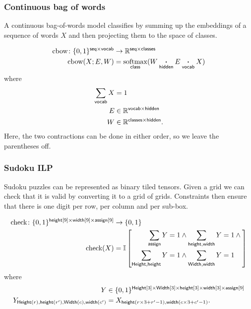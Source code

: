 \documentclass{article}
\newcommand{\reals}{\mathbb{R}}
\begin{document}
\subsubsection{Continuous bag of words}

A continuous bag-of-words model classifies by summing up the embeddings of a sequence of words $X$ and then projecting them to the space of classes. 

\begin{align*}
\text{cbow} \colon \{0, 1\}^{\name{seq} \times \name{vocab}} &\rightarrow \reals^{\name{seq} \times \name{classes}} \\
\text{cbow}(X; E, W) &= \nfun{class}{softmax} (W \ndot{hidden} E \ndot{vocab} X)
\end{align*}
where
\begin{align*}
\nsum{vocab} X &= 1 \\
E &\in \reals^{\name{vocab} \times \name{hidden}} \\
W &\in \reals^{\name{classes} \times \name{hidden}}.
\end{align*}
Here, the two contractions can be done in either order, so we leave the parentheses off.

\subsubsection{Sudoku ILP}

Sudoku puzzles can be represented as  binary tiled tensors.
Given a grid we can check that it is valid by converting it to a grid of grids. 
Constraints then ensure that there is one digit per row, per column and per sub-box.

\begin{align*}
\text{check} \colon \{0, 1\}^{\mathsf{height}[9] \times \mathsf{width}[9] \times \mathsf{assign}[9]} &\rightarrow \{0, 1\} \\
\text{check}(X) &=
\mathbb{I}\left[\begin{aligned}
\sum\limits_{\mathsf{assign}} Y = 1 &\land \sum\limits_{\mathsf{height, width}} Y = 1 \land {} \\
\sum\limits_{\mathsf{Height, height}} Y = 1 &\land \sum\limits_{\mathsf{Width, width}} Y = 1
\end{aligned}\right]
\end{align*}
where
\begin{align*}
Y &\in \{0, 1\}^{\mathsf{Height}[3] \times \mathsf{Width}[3] \times \mathsf{height}[3] \times \mathsf{width}[3] \times \mathsf{assign}[9]}  \\
Y_{\mathsf{Height}(r), \mathsf{height}(r'), \mathsf{Width}(c), \mathsf{width}(c')} &= X_{\mathsf{height}(r\times 3 + r'-1), \mathsf{width}(c\times3 + c'-1)}.
\end{align*} 
\end{document}
